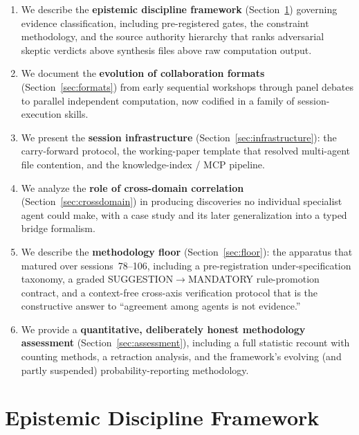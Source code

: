 \documentclass[12pt,a4paper]{article}
\begin{document}
\begin{enumerate}[label=(\arabic*)]
    \item We describe the \textbf{epistemic discipline framework} (Section~\ref{sec:epistemic}) governing evidence classification, including pre-registered gates, the constraint methodology, and the source authority hierarchy that ranks adversarial skeptic verdicts above synthesis files above raw computation output.

    \item We document the \textbf{evolution of collaboration formats} (Section~\ref{sec:formats}) from early sequential workshops through panel debates to parallel independent computation, now codified in a family of session-execution skills.

    \item We present the \textbf{session infrastructure} (Section~\ref{sec:infrastructure}): the carry-forward protocol, the working-paper template that resolved multi-agent file contention, and the knowledge-index / MCP pipeline.

    \item We analyze the \textbf{role of cross-domain correlation} (Section~\ref{sec:crossdomain}) in producing discoveries no individual specialist agent could make, with a case study and its later generalization into a typed bridge formalism.

    \item We describe the \textbf{methodology floor} (Section~\ref{sec:floor}): the apparatus that matured over sessions~78--106, including a pre-registration under-specification taxonomy, a graded SUGGESTION$\to$MANDATORY rule-promotion contract, and a context-free cross-axis verification protocol that is the constructive answer to ``agreement among agents is not evidence.''

    \item We provide a \textbf{quantitative, deliberately honest methodology assessment} (Section~\ref{sec:assessment}), including a full statistic recount with counting methods, a retraction analysis, and the framework's evolving (and partly suspended) probability-reporting methodology.
\end{enumerate}

\section{Epistemic Discipline Framework}
\label{sec:epistemic}
\end{document}
